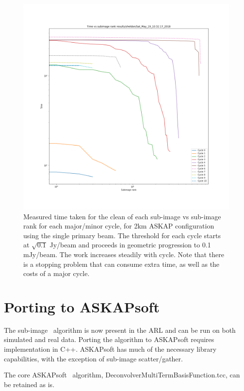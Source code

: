 \documentclass[11pt,a4paper,variablewidth]{article}
\begin{document}
\begin{figure}[H]
  \centering
  \includegraphics[width=\textwidth]{./pngs/time_versus_rank.png}
  \caption{Measured time taken for the clean of each sub-image vs sub-image rank for each major/minor cycle, for 2km ASKAP configuration using the single primary beam. The threshold for each cycle starts at $\sqrt{0.1}$ Jy/beam and proceeds in geometric progression to 0.1 mJy/beam. The work increases steadily with cycle. Note that there is a stopping problem that can consume extra time, as well as the costs of a major cycle.}
  \label{fig:time_vs_rank}
\end{figure}

\pagebreak
\section{Porting to ASKAPsoft}

The sub-image \MAM\ algorithm is now present in the ARL and can be run on both simulated and real data. Porting the algorithm to ASKAPsoft requires implementation in C++. ASKAPsoft has much of the necessary library capabilities, with the exception of sub-image scatter/gather.

The core ASKAPsoft \MAM\ algorithm, DeconvolverMultiTermBasisFunction.tcc, can be retained as is.
\end{document}
